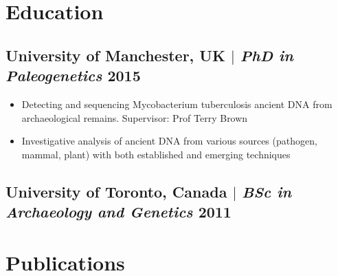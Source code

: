 \documentclass[11pt]{article}
\begin{document}
\section{Education}
\bigskip
\subsection{University of Manchester, UK $|$ {\normalfont\textit{PhD in Paleogenetics} \hfill 2015}}
\begin{itemize}
    \item Detecting and sequencing Mycobacterium tuberculosis ancient DNA from archaeological remains. Supervisor: Prof Terry Brown
    \item Investigative analysis of ancient DNA from various sources (pathogen, mammal, plant) with both established and emerging techniques
\end{itemize}

\subsection{University of Toronto, Canada $|$ {\normalfont\textit{BSc in Archaeology and Genetics} \hfill 2011}}
\bigskip
\bigskip



\section{Publications}

\nocite{*}
\setlength{\bibhang}{0pt}
\printbibliography[heading=none]
\vspace{-5pt}



\end{document}
